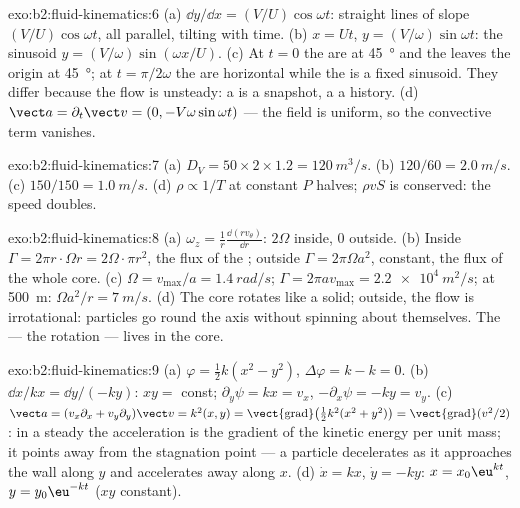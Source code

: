 \begin{solution}{exo:b2:fluid-kinematics:6}
(a) $\dd y/\dd x = (V/U)\cos\omega t$: straight lines of slope
$(V/U)\cos\omega t$, all parallel, tilting with time. (b) $x = Ut$, $y =
(V/\omega)\sin\omega t$: the sinusoid $y = (V/\omega)\sin(\omega x/U)$. (c) At
$t = 0$ the  are at \qty{45}{\degree} and the  leaves
the origin at \qty{45}{\degree}; at $t = \pi/2\omega$ the  are
horizontal while the  is a fixed sinusoid. They differ because
the flow is unsteady: a  is a snapshot, a  a history.
(d) $\vect a = \partial_t\vect v = (0, -V\omega\sin\omega t)$ --- the field is
uniform, so the convective term vanishes.
\end{solution}

\begin{solution}{exo:b2:fluid-kinematics:7}
(a) $D_V = 50 \times 2 \times 1.2 = \qty{120}{m^3/s}$. (b) $120/60 = \qty{2.0}{m/s}$.
(c) $150/150 = \qty{1.0}{m/s}$. (d) $\rho \propto 1/T$ at constant $P$ halves;
$\rho vS$ is conserved: the speed doubles.
\end{solution}

\begin{solution}{exo:b2:fluid-kinematics:8}
(a) $\omega_z = \frac1r\frac{\dd(rv_\theta)}{\dd r}$: $2\Omega$ inside, $0$
outside. (b) Inside $\Gamma = 2\pi r\cdot\Omega r = 2\Omega\cdot\pi r^2$, the flux
of the ; outside $\Gamma = 2\pi\Omega a^2$, constant, the flux of
the whole core. (c) $\Omega = v_{\max}/a = \qty{1.4}{rad/s}$; $\Gamma = 2\pi av_{\max}
= \qty{2.2e4}{m^2/s}$; at \qty{500}{m}: $\Omega a^2/r = \qty{7}{m/s}$. (d) The
core rotates like a solid; outside, the flow is irrotational: particles
go round the axis without spinning about themselves. The  ---
the rotation --- lives in the core.
\end{solution}

\begin{solution}{exo:b2:fluid-kinematics:9}
(a) $\varphi = \tfrac12k(x^2 - y^2)$, $\Delta\varphi = k - k = 0$. (b) $\dd x/
kx = \dd y/(-ky)$: $xy = $ const; $\partial_y\psi = kx = v_x$, $-\partial_x\psi =
-ky = v_y$. (c) $\vect a = (v_x\partial_x + v_y\partial_y)\vect v = k^2(x, y) =
\operatorname{\vect{grad}}\bigl(\tfrac12k^2(x^2 + y^2)\bigr) = \operatorname{\vect{grad}}
(v^2/2)$: in a steady  the acceleration is the
gradient of the kinetic energy per unit mass; it points away from the
stagnation point --- a particle decelerates as it approaches the wall
along $y$ and accelerates away along $x$. (d) $\dot x = kx$, $\dot y = -ky$:
$x = x_0\eu^{kt}$, $y = y_0\eu^{-kt}$ ($xy$ constant).
\end{solution}

